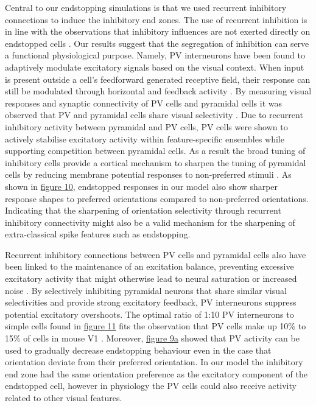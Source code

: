 \documentclass[12pt]{article}
\begin{document}
Central to our endstopping simulations is that we used recurrent inhibitory connections to induce the inhibitory end zones. The use of recurrent inhibition is in line with the observations that inhibitory influences are not exerted directly on endstopped cells \autocite{sillitoContributionExcitatoryInhibitory1977}. Our results suggest that the segregation of inhibition can serve a functional physiological purpose. Namely, PV interneurons have been found to adaptively modulate excitatory signals based on the visual context. When input is present outside a cell's feedforward generated receptive field, their response can still be modulated through horizontal and feedback activity \autocite{schnabelFiguregroundPerceptionAwake2018}. By measuring visual responses and synaptic connectivity of PV cells and pyramidal cells it was observed that PV and pyramidal cells share visual selectivity \autocite{znamenskiyFunctionalSpecificityRecurrent2024}. Due to recurrent inhibitory activity between pyramidal and PV cells, PV cells were shown to actively stabilise excitatory activity within feature-specific ensembles while supporting competition between pyramidal cells. As a result the broad tuning of inhibitory cells provide a cortical mechanism to sharpen the tuning of pyramidal cells by reducing membrane potential responses to non-preferred stimuli \autocite{liBroadeningInhibitoryTuning2012}. As shown in \hyperref[fig:endstopping_length]{figure 10}, endstopped responses in our model also show sharper response shapes to preferred orientations compared to non-preferred orientations. Indicating that the sharpening of orientation selectivity through recurrent inhibitory connectivity might also be a valid mechanism for the sharpening of extra-classical spike features such as endstopping.

Recurrent inhibitory connections between PV cells and pyramidal cells also have been linked to the maintenance of an excitation balance, preventing excessive excitatory activity that might otherwise lead to neural saturation or increased noise \autocite{maHierarchySensoryProcessing2021}. By selectively inhibiting pyramidal neurons that share similar visual selectivities and provide strong excitatory feedback, PV interneurons suppress potential excitatory overshoots. The optimal ratio of 1:10 PV interneurons to simple cells found in \hyperref[fig:endstop_network]{figure 11} fits the observation that PV cells make up 10\% to 15\% of cells in mouse V1 \autocite{meyerInhibitoryInterneuronsCortical2011}. Moreover, \hyperref[fig:endstopping]{figure 9a} showed that PV activity can be used to gradually decrease endstopping behaviour even in the case that orientation deviate from their preferred orientation. In our model the inhibitory end zone had the same orientation preference as the excitatory component of the endstopped cell, however in physiology the PV cells could also receive activity related to other visual features.
\end{document}
